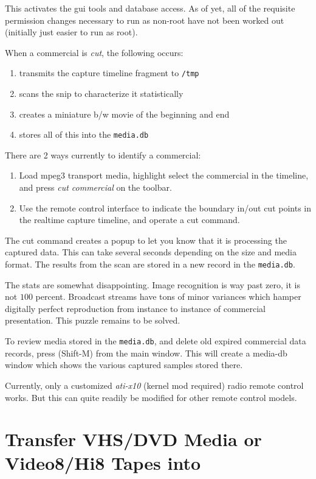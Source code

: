 This activates the gui tools and database access.  As of yet, all of the requisite permission changes
necessary to run as non-root have not been worked out (initially just easier to run as root).

When a commercial is \textit{cut}, the following occurs:

\begin{enumerate}
    \item transmits the capture timeline fragment to \texttt{/tmp}
    \item scans the snip to characterize it statistically
    \item creates a miniature b/w movie of the beginning and end
    \item stores all of this into the \texttt{media.db}
\end{enumerate}

There are 2 ways currently to identify a commercial:

\begin{enumerate}
    \item Load mpeg3 transport media, highlight select the commercial in the  timeline, and press \textit{cut commercial} on the toolbar.
    \item Use the remote control interface to indicate the boundary in/out cut points in the realtime capture timeline, and operate a cut command.    
\end{enumerate}

The cut command creates a popup to let you know that it is processing the captured data.  This can take several seconds depending on the size and media format.  The results from the scan are stored in a new record in the \texttt{media.db}.

The stats are somewhat disappointing.  Image recognition is way past zero, it is not $100$ percent. Broadcast streams have tons of minor variances which hamper digitally perfect reproduction from instance to instance of commercial presentation.  This puzzle remains to be solved.

To review media stored in the \texttt{media.db}, and delete old expired commercial data records, press (Shift-M) from the main window.  This will create a media-db window which shows the various captured samples stored there.

Currently, only a customized \textit{ati-x10} (kernel mod required) radio remote control works.  But this can quite readily be modified for other remote control models.

\section{Transfer VHS/DVD Media or Video8/Hi8 Tapes into \CGG{}}%
\label{sec:transfer_vhs_dvd_tapes_into_cinelerra}

